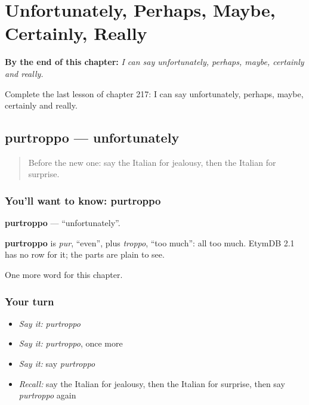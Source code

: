 
\chapter{Unfortunately, Perhaps, Maybe, Certainly, Really}
\label{ch:it-unfortunately-perhaps-maybe-certainly-really}

\begin{chapteropening}
\textbf{By the end of this chapter:} \emph{I can say unfortunately, perhaps, maybe, certainly and really.}

Complete the last lesson of chapter 217: I can say unfortunately, perhaps, maybe, certainly and really.
\end{chapteropening}

\section[purtroppo]{purtroppo — unfortunately}

\label{lesson:IT-C217-purtroppo}



\begin{quote}
Before the new one: say the Italian for jealousy, then the Italian for surprise.
\end{quote}

\subsection*{You'll want to know: purtroppo}
\textbf{purtroppo} — \textquotedblleft{}unfortunately\textquotedblright{}.

\begin{cousinweb}
\textbf{purtroppo} is \emph{pur}, \textquotedblleft{}even\textquotedblright{}, plus \emph{troppo}, \textquotedblleft{}too much\textquotedblright{}: all too much. EtymDB 2.1 has no row for it; the parts are plain to see.
\end{cousinweb}

\begin{grammarlens}[title={What you've built}]
One more word for this chapter.
\end{grammarlens}

\subsection*{Your turn}
\begin{itemize}
\raggedright
  \item \emph{Say it:} \emph{purtroppo}
  \item \emph{Say it:} \emph{purtroppo}, once more
  \item \emph{Say it:} say \emph{purtroppo}
  \item \emph{Recall:} say the Italian for jealousy, then the Italian for surprise, then say \emph{purtroppo} again
\end{itemize}


